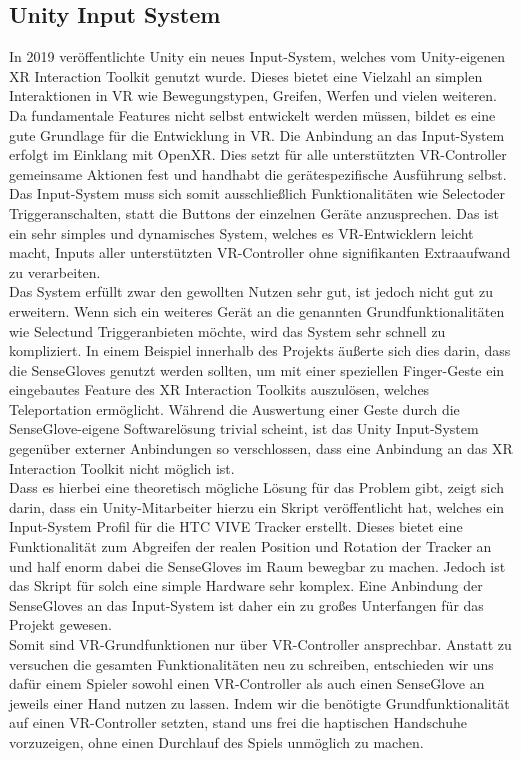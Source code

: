 \subsection{Unity Input System}
In 2019 veröffentlichte Unity ein neues Input-System, welches vom Unity-eigenen XR Interaction Toolkit genutzt wurde. Dieses bietet eine Vielzahl an simplen Interaktionen in VR wie Bewegungstypen, Greifen, Werfen und vielen weiteren. Da fundamentale Features nicht selbst entwickelt werden müssen, bildet es eine gute Grundlage für die Entwicklung in VR. Die Anbindung an das Input-System erfolgt im Einklang mit OpenXR. Dies setzt für alle unterstützten VR-Controller gemeinsame Aktionen fest und handhabt die gerätespezifische Ausführung selbst. Das Input-System muss sich somit ausschließlich Funktionalitäten wie \dq Select\dq oder \dq Trigger\dq anschalten, statt die Buttons der einzelnen Geräte anzusprechen. Das ist ein sehr simples und dynamisches System, welches es VR-Entwicklern leicht macht, Inputs aller unterstützten VR-Controller ohne signifikanten Extraaufwand zu verarbeiten.\\
\noindent Das System erfüllt zwar den gewollten Nutzen sehr gut, ist jedoch nicht gut zu erweitern. Wenn sich ein weiteres Gerät an die genannten Grundfunktionalitäten wie \dq Select\dq und \dq Trigger\dq anbieten möchte, wird das System sehr schnell zu kompliziert. In einem Beispiel innerhalb des Projekts äußerte sich dies darin, dass die SenseGloves genutzt werden sollten, um mit einer speziellen Finger-Geste ein eingebautes Feature des XR Interaction Toolkits auszulösen, welches Teleportation ermöglicht. Während die Auswertung einer Geste durch die SenseGlove-eigene Softwarelösung trivial scheint, ist das Unity Input-System gegenüber externer Anbindungen so verschlossen, dass eine Anbindung an das XR Interaction Toolkit nicht möglich ist.\\
\noindent Dass es hierbei eine theoretisch mögliche Lösung für das Problem gibt, zeigt sich darin, dass ein Unity-Mitarbeiter hierzu ein Skript veröffentlicht hat, welches ein Input-System Profil für die HTC VIVE Tracker erstellt. Dieses bietet eine Funktionalität zum Abgreifen der realen Position und Rotation der Tracker an und half enorm dabei die SenseGloves im Raum bewegbar zu machen. Jedoch ist das Skript für solch eine simple Hardware sehr komplex. Eine Anbindung der SenseGloves an das Input-System ist daher ein zu großes Unterfangen für das Projekt gewesen.\\
\noindent Somit sind VR-Grundfunktionen nur über VR-Controller ansprechbar. Anstatt zu versuchen die gesamten Funktionalitäten neu zu schreiben, entschieden wir uns dafür einem Spieler sowohl einen VR-Controller als auch einen SenseGlove an jeweils einer Hand nutzen zu lassen. Indem wir die benötigte Grundfunktionalität auf einen VR-Controller setzten, stand uns frei die haptischen Handschuhe vorzuzeigen, ohne einen Durchlauf des Spiels unmöglich zu machen.

